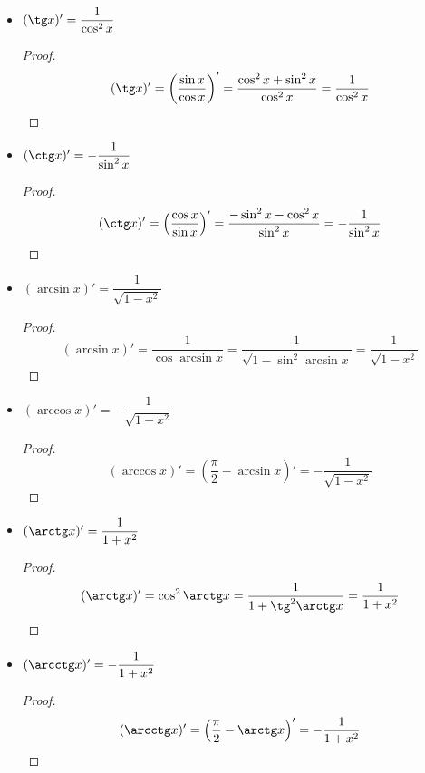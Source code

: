 \begin{itemize}
	\item $(\tg x)' = \dfrac1{\cos^2 x}$
	\begin{proof}
	\begin{equation*}
	(\tg x)' =
	\left( \frac{\sin x}{\cos x} \right)' =
	\frac{\cos^2 x + \sin^2 x}{\cos^2 x} =
	\frac1{\cos^2 x}
	\end{equation*}
	\end{proof}
	
	\item $(\ctg x)' = -\dfrac1{\sin^2 x}$
	\begin{proof}
	\begin{equation*}
	(\ctg x)' =
	\left( \frac{\cos x}{\sin x} \right)' =
	\frac{-\sin^2 x - \cos^2 x}{\sin^2 x} =
	-\frac1{\sin^2 x}
	\end{equation*}
	\end{proof}
	
	\item $(\arcsin x)' = \dfrac1{\sqrt{1 - x^2}}$
	\begin{proof}
	\begin{equation*}
	(\arcsin x)' =
	\frac1{\cos \arcsin x} =
	\frac1{\sqrt{1 - \sin^2 \arcsin x}} =
	\frac1{\sqrt{1 - x^2}}
	\end{equation*}
	\end{proof}
	
	\item $(\arccos x)' = -\dfrac1{\sqrt{1 - x^2}}$
	\begin{proof}
	\begin{equation*}
	(\arccos x)' =
	\left( \frac\pi{2} - \arcsin x \right)' =
	-\frac1{\sqrt{1 - x^2}}
	\end{equation*}
	\end{proof}
	
	\item $(\arctg x)' = \dfrac1{1 + x^2}$
	\begin{proof}
	\begin{equation*}
	(\arctg x)' =
	\cos^2 \arctg x =
	\frac1{1 + \tg^2 \arctg x} =
	\frac1{1 + x^2}
	\end{equation*}
	\end{proof}
	
	\item $(\arcctg x)' = -\dfrac1{1 + x^2}$
	\begin{proof}
	\begin{equation*}
	(\arcctg x)' =
	\left( \frac\pi{2} - \arctg x \right)' =
	-\frac1{1 + x^2}
	\end{equation*}
	\end{proof}
\end{itemize}